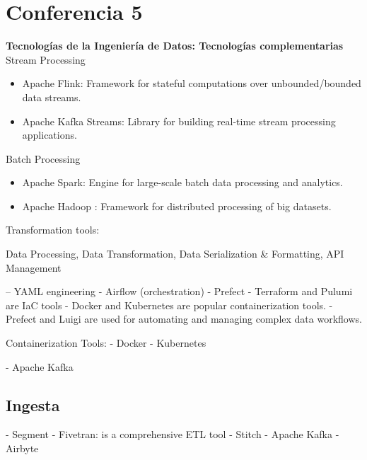 \documentclass[12pt]{book}
\begin{document}
\chapter{Conferencia 5}
\normalfont\LARGE \textbf{Tecnologías de la Ingeniería de Datos: Tecnologías complementarias}
\normalfont\small\\

Stream Processing
\begin{itemize}
    \item Apache Flink: Framework for stateful computations over unbounded/bounded data streams.
    \item Apache Kafka Streams: Library for building real-time stream processing applications.
\end{itemize}

Batch Processing
\begin{itemize}
    \item Apache Spark: Engine for large-scale batch data processing and analytics.
    \item Apache Hadoop : Framework for distributed processing of big datasets.
\end{itemize}

Transformation tools:


Data Processing, Data Transformation, Data Serialization & Formatting, API Management

--  YAML engineering 
- Airflow (orchestration)
- Prefect
- Terraform and Pulumi are IaC tools
- Docker and Kubernetes are popular containerization tools.
- Prefect and Luigi are used for automating and managing complex data workflows.


Containerization Tools:
- Docker
- Kubernetes


- Apache Kafka


\section{Ingesta}
- Segment
- Fivetran: is a comprehensive ETL tool
- Stitch
- Apache Kafka
- Airbyte 
\end{document}
